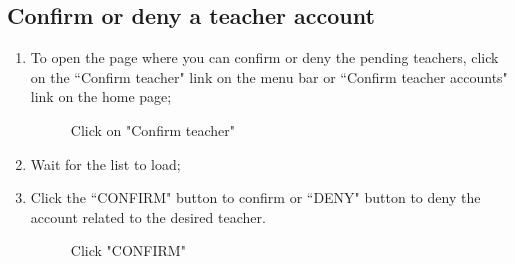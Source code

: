 \documentclass[ManualeUtente]{subfiles}
\begin{document}
	\subsection{Confirm or deny a teacher account}
	\begin{enumerate}
		\item  To open the page where you can confirm or deny the pending teachers, click on the \textquotedblleft Confirm teacher" link on the menu bar or \textquotedblleft Confirm teacher accounts" link on the home page;
		\begin{figure}[H]
			\centering
			\caption{Click on "Confirm teacher"}
			\label{fig:Click on "Confirm teacher"}
		\end{figure}
		\item Wait for the list to load;
		\item Click the \textquotedblleft CONFIRM" button to confirm or \textquotedblleft DENY" button to deny the account related to the desired teacher.
		\begin{figure}[H]
			\centering
			\caption{Click "CONFIRM"}
			\label{fig:Click "CONFIRM"}
		\end{figure}
	\end{enumerate}
	
\end{document}
